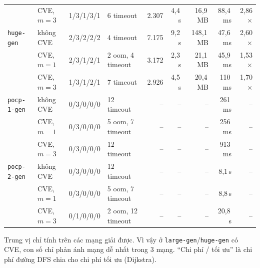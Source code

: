 \documentclass[11pt,a4paper]{article}
\begin{document}
\begin{center}
\begin{tabular}{@{}llcl rrr rr@{}}
 & CVE, $m{=}3$ & 1/3/1/3/1 & 6 timeout & 2.307 & 4{,}4\,s & 16{,}9\,MB & 88{,}4\,ms & 2{,}86$\times$ \\
\texttt{huge-gen} & không CVE & 2/3/2/2/2 & 4 timeout & 7.175 & 9{,}2\,s & 148{,}1\,MB & 47{,}6\,ms & 2{,}60$\times$ \\
 & CVE, $m{=}1$ & 2/3/1/2/1 & 2 oom, 4 timeout & 3.172 & 2{,}3\,s & 21{,}1\,MB & 45{,}9\,ms & 1{,}53$\times$ \\
 & CVE, $m{=}3$ & 1/3/1/2/1 & 7 timeout & 2.926 & 4{,}5\,s & 20{,}4\,MB & 110\,ms & 1{,}70$\times$ \\
\texttt{pocp-1-gen} & không CVE & 0/3/0/0/0 & 12 timeout & -- & -- & -- & 261\,ms & -- \\
 & CVE, $m{=}1$ & 0/3/0/0/0 & 5 oom, 7 timeout & -- & -- & -- & 256\,ms & -- \\
 & CVE, $m{=}3$ & 0/3/0/0/0 & 12 timeout & -- & -- & -- & 913\,ms & -- \\
\texttt{pocp-2-gen} & không CVE & 0/3/0/0/0 & 12 timeout & -- & -- & -- & 8{,}1\,s & -- \\
 & CVE, $m{=}1$ & 0/3/0/0/0 & 5 oom, 7 timeout & -- & -- & -- & 8{,}8\,s & -- \\
 & CVE, $m{=}3$ & 0/1/0/0/0 & 2 oom, 12 timeout & -- & -- & -- & 20{,}8\,s & -- \\
\bottomrule
\end{tabular}
\end{center}
{\footnotesize Trung vị chỉ tính trên các mạng giải được. Vì vậy ở \texttt{large-gen}/\texttt{huge-gen} có CVE, con số chỉ phản ánh mạng dễ nhất trong 3 mạng. ``Chi phí / tối ưu'' là chi phí đường DFS chia cho chi phí tối ưu (Dijkstra).}
\end{document}
